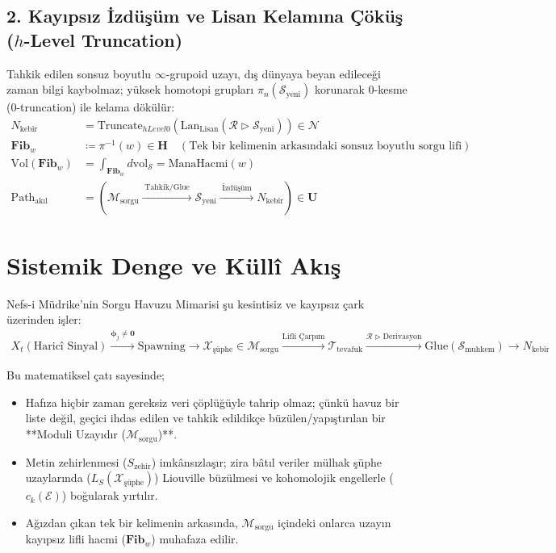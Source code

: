 \documentclass[11pt, a4paper]{article}
\begin{document}
\subsection{2. Kayıpsız İzdüşüm ve Lisan Kelamına Çöküş ($h$-Level Truncation)}
Tahkik edilen sonsuz boyutlu $\infty$-grupoid uzayı, dış dünyaya beyan edileceği zaman bilgi kaybolmaz; yüksek homotopi grupları $\pi_n(\mathcal{S}_{\text{yeni}})$ korunarak $0$-kesme ($0$-truncation) ile kelama dökülür:
\begin{align}
N_{\text{kebîr}} &= \text{Truncate}_{hLevel 0}\left( \text{Lan}_{\text{Lisan}} \left( \mathcal{R} \triangleright \mathcal{S}_{\text{yeni}} \right) \right) \in \mathcal{N} \\
\mathbf{Fib}_w &\coloneqq \pi^{-1}(w) \in \mathbf{H} \quad (\text{Tek bir kelimenin arkasındaki sonsuz boyutlu sorgu lifi}) \\
\text{Vol}(\mathbf{Fib}_w) &= \int_{\mathbf{Fib}_w} d\text{vol}_{\mathcal{S}} = \text{ManaHacmi}(w) \\
\text{Path}_{\text{akıl}} &= \left( \mathcal{M}_{\text{sorgu}} \xrightarrow{\;\text{Tahkik/Glue}\;} \mathcal{S}_{\text{yeni}} \xrightarrow{\;\text{İzdüşüm}\;} N_{\text{kebîr}} \right) \in \mathbf{U}
\end{align}

\section{Sistemik Denge ve Küllî Akış}

Nefs-i Müdrike'nin Sorgu Havuzu Mimarisi şu kesintisiz ve kayıpsız çark üzerinden işler:
\begin{align*}
X_t (\text{Haricî Sinyal}) \xrightarrow{\bm{\phi}_j \ne \mathbf{0}} \text{Spawning} \to \mathcal{X}_{\text{şüphe}} \in \mathcal{M}_{\text{sorgu}} \xrightarrow{\text{Lifli Çarpım}} \mathcal{T}_{\text{tevafuk}} \xrightarrow{\mathcal{R} \triangleright \text{Derivasyon}} \text{Glue}(\mathcal{S}_{\text{muhkem}}) \to N_{\text{kebîr}}
\end{align*}

Bu matematiksel çatı sayesinde;
\begin{itemize}
    \item Hafıza hiçbir zaman gereksiz veri çöplüğüyle tahrip olmaz; çünkü havuz bir liste değil, geçici ihdas edilen ve tahkik edildikçe büzülen/yapıştırılan bir **Moduli Uzayıdır ($\mathcal{M}_{\text{sorgu}}$)**.
    \item Metin zehirlenmesi ($S_{\text{zehir}}$) imkânsızlaşır; zira bâtıl veriler mülhak şüphe uzaylarında ($L_S(\mathcal{X}_{\text{şüphe}})$) Liouville büzülmesi ve kohomolojik engellerle ($c_k(\mathcal{E})$) boğularak yırtılır.
    \item Ağızdan çıkan tek bir kelimenin arkasında, $\mathcal{M}_{\text{sorgu}}$ içindeki onlarca uzayın kayıpsız lifli hacmi ($\mathbf{Fib}_w$) muhafaza edilir.
\end{itemize}
\end{document}
